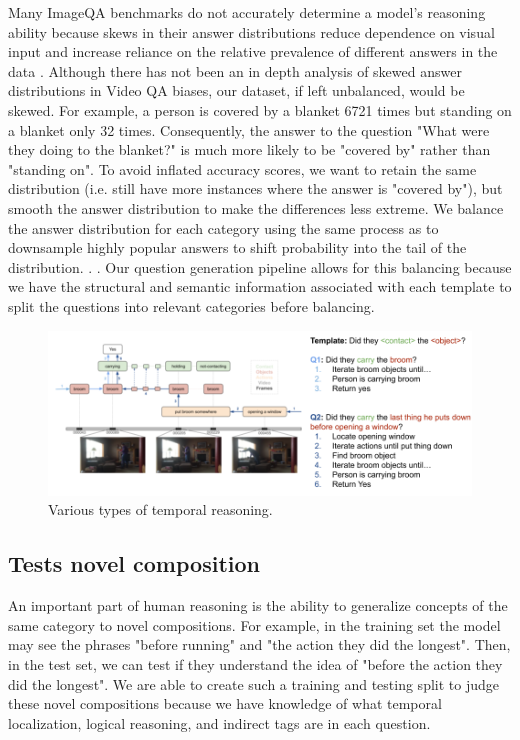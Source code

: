 \documentclass[10pt,twocolumn,letterpaper]{article}
\newcommand{\mgm}[1]{{\color{cyan}{mgm: #1}}}
\begin{document}
    Many ImageQA benchmarks do not accurately determine a model's reasoning ability because skews in their answer distributions reduce dependence on visual input and increase reliance on the relative prevalence of different answers in the data \cite{hudson2019gqa, goyal2017making}. Although there has not been an in depth analysis of skewed answer distributions in Video QA biases, our dataset, if left unbalanced, would be skewed. For example, a person is covered by a blanket 6721 times but standing on a blanket only 32 times. Consequently, the answer to the question "What were they doing to the blanket?" is much more likely to be "covered by" rather than "standing on". To avoid inflated accuracy scores, we want to retain the same distribution (i.e. still have more instances where the answer is "covered by"), but smooth the answer distribution to make the differences less extreme. We balance the answer distribution for each category using the same process as \cite{hudson2019gqa} to downsample highly popular answers to shift probability into the tail of the distribution. \mgm{Talk about the process in detail for doing that? Global vs local variables}. \mgm{Include graphs}. Our question generation pipeline allows for this balancing because we have the structural and semantic information associated with each template to split the questions into relevant categories before balancing. 
    
    \begin{figure}[t]
\begin{center}
\includegraphics[width=0.8\linewidth]{Figures/figure_compareQs.png}
\end{center}
   \caption{Various types of temporal reasoning.}
\label{fig:long}
\label{fig:onecol}
\end{figure}

    
   \subsection{Tests novel composition}
    
    An important part of human reasoning is the ability to generalize concepts of the same category to novel compositions. For example, in the training set the model may see the phrases "before running" and "the action they did the longest". Then, in the test set, we can test if they understand the idea of "before the action they did the longest". We are able to create such a training and testing split to judge these novel compositions because we have knowledge of what temporal localization, logical reasoning, and indirect tags are in each question. \mgm{Potentially VG slide 18 for how to solve them?}
    
\end{document}
